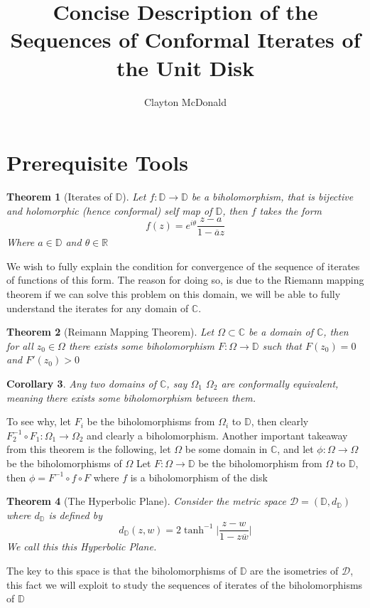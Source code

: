 \documentclass{article}
\title{Concise Description of the Sequences of Conformal Iterates of the Unit Disk}
\author{Clayton McDonald}
\newcommand{\R}{\mathbb{R}}
\newcommand{\C}{\mathbb{C}}
\newcommand{\DD}{\mathbb{D}}
\newtheorem{theorem}{Theorem}
\newtheorem{corollary}[theorem]{Corollary}
\begin{document}
\maketitle
\section{Prerequisite Tools}

\begin{theorem}[Iterates of $\DD$]
    Let $f:\DD\to\DD$ be a biholomorphism, that is bijective and holomorphic (hence conformal) self map of $\DD$, then $f$ takes the form
    \begin{equation*}
        f(z) = e^{i\theta} \frac{z-a}{1-\overline{a}z}
    \end{equation*}
Where $a\in\DD$ and $\theta\in\R$
\end{theorem}
We wish to fully explain the condition for convergence of the sequence of iterates of functions of this form.
The reason for doing so, is due to the Riemann mapping theorem if we can solve this problem on this domain, we will be able to fully understand
the iterates for any domain of $\C$. 
\begin{theorem}[Reimann Mapping Theorem]
Let $\Omega\subset\C$ be a domain of $\C$, then for all $z_0\in\Omega$ there exists some biholomorphism $F:\Omega\to\DD$ such that $F(z_0) = 0$ and $F'(z_0)>0$
\end{theorem}
\begin{corollary}
    Any two domains of $\C$, say $\Omega_1$ $\Omega_2$ are conformally equivalent, meaning there exists some biholomorphism between them.
\end{corollary}
To see why, let $F_i$ be the biholomorphisms from $\Omega_i$ to $\DD$, then clearly $F_2^{-1} \circ F_1:\Omega_1\to\Omega_2$ and clearly a biholomorphism. 
Another important takeaway from this theorem is the following, let $\Omega$ be some domain in $\C$, and let $\phi:\Omega\to\Omega$ be the biholomorphisms of $\Omega$
Let $F:\Omega\to\DD$ be the biholomorphism from $\Omega$ to $\DD$, then $\phi = F^{-1}\circ f\circ F$ where $f$ is a biholomorphism of the disk 
\begin{theorem}[The Hyperbolic Plane]
    Consider the metric space $\mathcal{D} = (\DD, d_\DD)$ where $d_\DD$ is defined by
    \begin{equation*}
        d_\DD (z, w) = 2 \tanh^{-1}\bigg|\frac{z-w}{1-z\overline{w}} \bigg|
    \end{equation*}
We call this this Hyperbolic Plane.
\end{theorem}
The key to this space is that the biholomorphisms of $\DD$ are the isometries of $\mathcal{D}$, this fact we will exploit to study the sequences of iterates of the biholomorphisms of $\DD$
\end{document}
